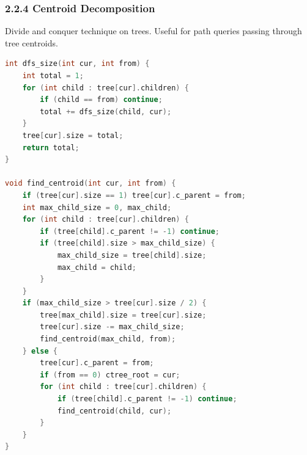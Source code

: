 \documentclass[10pt, a4paper, twocolumn]{article}
\begin{document}
\subsubsection{2.2.4 Centroid Decomposition}
Divide and conquer technique on trees. Useful for path queries passing through tree centroids.
\begin{lstlisting}[language=C++]
int dfs_size(int cur, int from) {
    int total = 1;
    for (int child : tree[cur].children) {
        if (child == from) continue;
        total += dfs_size(child, cur);
    }
    tree[cur].size = total;
    return total;
}

void find_centroid(int cur, int from) {
    if (tree[cur].size == 1) tree[cur].c_parent = from;
    int max_child_size = 0, max_child;
    for (int child : tree[cur].children) {
        if (tree[child].c_parent != -1) continue;
        if (tree[child].size > max_child_size) {
            max_child_size = tree[child].size;
            max_child = child;
        }
    }
    if (max_child_size > tree[cur].size / 2) {
        tree[max_child].size = tree[cur].size;
        tree[cur].size -= max_child_size;
        find_centroid(max_child, from);
    } else {
        tree[cur].c_parent = from;
        if (from == 0) ctree_root = cur;
        for (int child : tree[cur].children) {
            if (tree[child].c_parent != -1) continue;
            find_centroid(child, cur);
        }
    }
}
\end{lstlisting}
\end{document}

